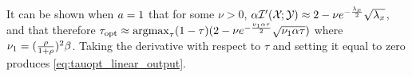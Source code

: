 \documentclass[12pt, draftclsnofoot,journal,onecolumn]{IEEEtran}
\begin{document}
It can be shown when $a=1$ that for some $\nu>0$, $\alpha\mathcal{I}{'}({\mathcal{X}}_{};{\mathcal{Y}}_{})\approx 2-\nu e^{-\frac{\lambda_x}{2}}\sqrt{\lambda_x}$, and that therefore $\tau_{{\rm opt}}\approx\mathop{\mathrm{argmax}}_{\tau}(1-\tau)(2-\nu e^{-\frac{\nu_1\alpha\tau}{2}}\sqrt{\nu_1\alpha\tau})$ where $\nu_1=(\frac{\rho}{1+\rho})^2\beta$.  Taking the derivative with respect to $\tau$ and setting it equal to zero produces \eqref{eq:tauopt_linear_output}.
\end{document}
